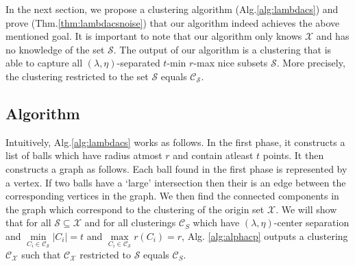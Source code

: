 \documentclass[11pt]{article}
\newcommand{\mc}{\mathcal}
\begin{document}
In the next section, we propose a clustering algorithm (Alg.\ref{alg:lambdacs}) and prove (Thm.\ref{thm:lambdacsnoise}) that our algorithm indeed achieves the above mentioned goal. It is important to note that our algorithm only knows $\mc X$ and has no knowledge of the set $\mc S$. The output of our algorithm is a clustering that is able to capture all $(\lambda, \eta)$-separated $t$-min $r$-max nice subsets $\mc S$. More precisely, the clustering restricted to the set $\mc S$ equals $\mc C_{\mc S}$.

\subsection{Algorithm}


Intuitively, Alg.\ref{alg:lambdacs} works as follows. In the first phase, it constructs a list of balls which have radius atmost $r$ and contain atleast $t$ points. It then constructs a graph as follows. Each ball found in the first phase is represented by a vertex. If two balls have a `large' intersection then their is an edge between the corresponding vertices in the graph. We then find the connected components in the graph which correspond to the clustering of the origin set $\mc X$. We will show that for all $\mc S \subseteq \mc X$ and for all clusterings $\mc C_S$ which have $(\lambda, \eta)$-center separation and $\min\limits_{C_i \in {\mc C}_{\mc S}} |C_i| = t$ and $\max\limits_{C_i \in {\mc C}_{\mc S}} r(C_i) = r$, Alg. \ref{alg:alphacp} outputs a clustering ${\mc C}_{\mc X}$ such that $\mc C_{\mc X}$ restricted to $\mc S$ equals $\mc C_S$. %
\end{document}
